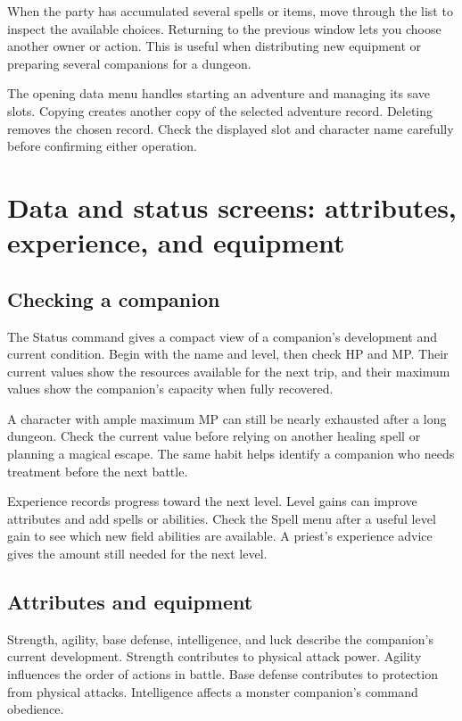 When the party has accumulated several spells or items, move through the
list to inspect the available choices. Returning to the previous window
lets you choose another owner or action. This is useful when distributing
new equipment or preparing several companions for a dungeon.

The opening data menu handles starting an adventure and managing its save
slots. Copying creates another copy of the selected adventure record.
Deleting removes the chosen record. Check the displayed slot and character
name carefully before confirming either operation.

\section{Data and status screens: attributes, experience, and equipment}

\subsection*{Checking a companion}

The Status command gives a compact view of a companion's development and
current condition. Begin with the name and level, then check HP and MP.
Their current values show the resources available for the next trip, and
their maximum values show the companion's capacity when fully recovered.

A character with ample maximum MP can still be nearly exhausted after a
long dungeon. Check the current value before relying on another healing
spell or planning a magical escape. The same habit helps identify a
companion who needs treatment before the next battle.

Experience records progress toward the next level. Level gains can improve
attributes and add spells or abilities. Check the Spell menu after a useful
level gain to see which new field abilities are available. A priest's
experience advice gives the amount still needed for the next level.

\subsection*{Attributes and equipment}

Strength, agility, base defense, intelligence, and luck describe the
companion's current development. Strength contributes to physical attack
power. Agility influences the order of actions in battle. Base defense
contributes to protection from physical attacks. Intelligence affects a
monster companion's command obedience.

